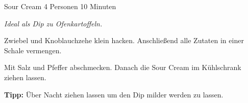 \documentclass[
  DIV=11,%
  pagesize,%
  fontsize=11pt,%
  paper=a4,%
]{scrartcl}
\begin{document}
\begin{recipe}{Sour Cream} {4 Personen} {10 Minuten}

\freeform
\textit{Ideal als Dip zu Ofenkartoffeln.}


Zwiebel und Knoblauchzehe klein hacken.
Anschließend alle Zutaten in einer Schale vermengen.

Mit Salz und Pfeffer abschmecken.
Danach die Sour Cream im Kühlschrank ziehen lassen.

\freeform
\hrulefill

\freeform 
\textbf{Tipp:}
Über Nacht ziehen lassen um den Dip milder werden zu lassen.

\end{recipe}
\end{document}
